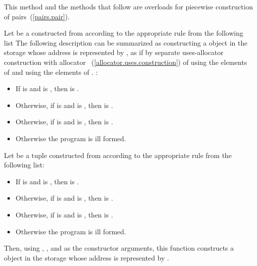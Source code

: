 \begin{itemdescr}
\pnum
\enternote
This method and the  methods that follow
are overloads for piecewise construction of pairs~(\ref{pairs.pair}).
\exitnote

\pnum
\effects
Let  be a  constructed from 
according to the appropriate rule from the following list
\enternote
The following description can be summarized as
constructing a  object
in the storage whose address is represented by ,
as if by separate uses-allocator construction
with allocator ~(\ref{allocator.uses.construction})
of  using the elements of 
and  using the elements of .
\exitnote
:
\begin{itemize}
\item
If  is  and
 is ,
then  is .
\item
Otherwise, if  is  and
is ,
then  is
.
\item
Otherwise, if  is  and
 is ,
then  is .
\item
Otherwise the program is ill formed.
\end{itemize}

Let  be a tuple constructed from 
according to the appropriate rule from the following list:
\begin{itemize}
\item
If  is  and
 is ,
then  is .
\item
Otherwise, if  is  and
is ,
then  is
.
\item
Otherwise, if  is  and
 is ,
then  is .
\item
Otherwise the program is ill formed.
\end{itemize}

Then, using , , and 
as the constructor arguments,
this function constructs a  object
in the storage whose address is represented by .
\end{itemdescr}

